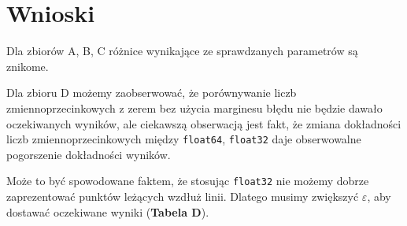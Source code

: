 \documentclass[12pt]{article}
\begin{document}
\section*{Wnioski}
\par
Dla zbiorów A, B, C różnice wynikające ze sprawdzanych parametrów są znikome.

\mbox{}\newline
Dla zbioru D możemy zaobserwować, że porównywanie liczb zmiennoprzecinkowych z zerem bez użycia marginesu błędu nie będzie dawało oczekiwanych wyników, ale ciekawszą obserwacją jest fakt, że zmiana dokładności liczb zmiennoprzecinkowych między \verb*|float64|, \verb*|float32| daje obserwowalne pogorszenie dokładności wyników.

Może to być spowodowane faktem, że stosując \verb*|float32| nie możemy dobrze zaprezentować punktów leżących wzdłuż linii. Dlatego musimy zwiększyć $\varepsilon$, aby dostawać oczekiwane wyniki (\textbf{Tabela D}).
\end{document}

